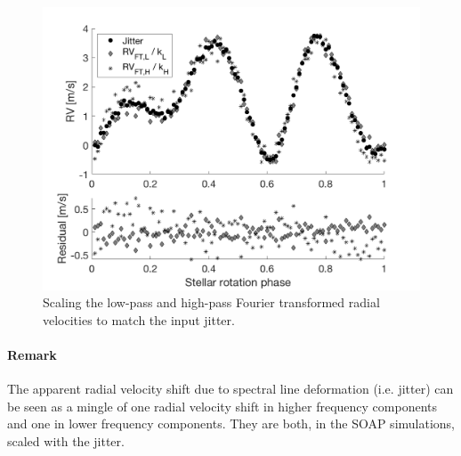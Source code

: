 \begin{figure}[tbp]
\centering
\includegraphics[width = 0.7 \linewidth]
{./Figures/Methods/5-JITTER_ONLY_4.png}
\caption[Scaling the low-pass and high-pass Fourier transformed radial velocities]
{Scaling the low-pass and high-pass Fourier transformed radial velocities to match the input jitter.}
\label{fig:scaling_RV_FT}
\end{figure} 

\paragraph{Remark} The apparent radial velocity shift due to spectral line deformation (i.e. jitter) can be seen as a mingle of one radial velocity shift in higher frequency components and one in lower frequency components. They are both, in the SOAP simulations, scaled with the jitter. 

